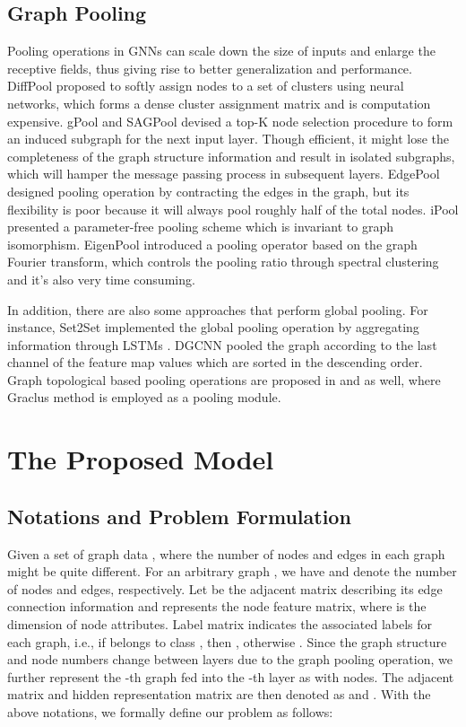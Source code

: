 \documentclass[letterpaper]{article} \usepackage{aaai20}  \usepackage{times}  \usepackage{helvet} \usepackage{courier}  \usepackage[hyphens]{url}  \usepackage{graphicx} \urlstyle{rm} \def\UrlFont{\rm}  \usepackage{graphicx}  \frenchspacing  \setlength{\pdfpagewidth}{8.5in}  \setlength{\pdfpageheight}{11in}
\begin{document}
\subsection{Graph Pooling}
Pooling operations in GNNs can scale down the size of inputs and enlarge the receptive fields, thus giving rise to better generalization and performance. DiffPool \cite{ying2018hierarchical} proposed to softly assign nodes to a set of clusters using neural networks, which forms a dense cluster assignment matrix and is computation expensive. gPool \cite{gao2019graph} and SAGPool \cite{lee2019self} devised a top-K node selection procedure to form an induced subgraph for the next input layer. Though efficient, it might lose the completeness of the graph structure information and result in isolated subgraphs, which will hamper the message passing process in subsequent layers. EdgePool \cite{diehl2019edge} designed pooling operation by contracting the edges in the graph, but its flexibility is poor because it will always pool roughly half of the total nodes. iPool \cite{gao2019ipool} presented a parameter-free pooling scheme which is invariant to graph isomorphism. EigenPool \cite{ma2019graph} introduced a pooling operator based on the graph Fourier transform, which controls the pooling ratio through spectral clustering and it's also very time consuming.

In addition, there are also some approaches that perform global pooling. For instance, Set2Set \cite{vinyals2015order} implemented the global pooling operation by aggregating information through LSTMs \cite{hochreiter1997long}. DGCNN \cite{zhang2018end} pooled the graph according to the last channel of the feature map values which are sorted in the descending order. Graph topological based pooling operations are proposed in \cite{defferrard2016convolutional} and \cite{rhee2017hybrid} as well, where Graclus method \cite{dhillon2007weighted} is employed as a pooling module. 

\section{The Proposed Model}
\subsection{Notations and Problem Formulation}
Given a set of graph data , where the number of nodes and edges in each graph might be quite different. For an arbitrary graph , we have  and  denote the number of nodes and edges, respectively. Let  be the adjacent matrix describing its edge connection information and  represents the node feature matrix, where  is the dimension of node attributes. Label matrix  indicates the associated labels for each graph, i.e., if  belongs to class , then , otherwise . Since the graph structure and node numbers change between layers due to the graph pooling operation, we further represent the -th graph fed into the -th layer as  with  nodes. The adjacent matrix and hidden representation matrix are then denoted as  and . With the above notations, we formally define our problem as follows:
\end{document}
